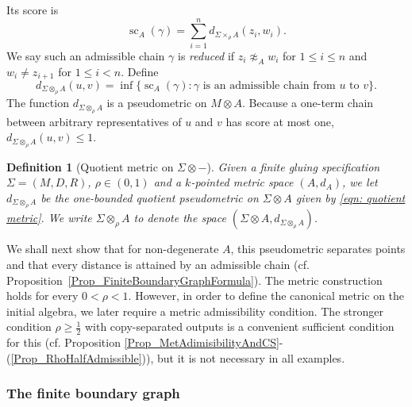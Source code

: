 \documentclass{sn-jnl}%
\theoremstyle{thmstyleone}%
\theoremstyle{thmstyletwo}%
\theoremstyle{thmstylethree}%
\newtheorem{definition}{Definition}%
\newcommand{\M}{\Sigma}
\newcommand{\F}{\M\otimes}
\newcommand{\Fw}{\M\otimes_{\w}}
\newcommand{\dm}[1]{d_{\M \times_{\w} #1}}
\newcommand{\dqm}[1]{d_{\M \otimes_{\w} #1}}
\newcommand{\w}{\rho}
\begin{document}
Its score is
\begin{equation*}
    \operatorname{sc}_A(\gamma) = \sum_{i=1}^n \dm{A}(z_i,w_i).
\label{Eqn_score}
\end{equation*}
We say such an admissible chain $\gamma$ is \emph{reduced} if $z_i\not\approx_A w_i$ for $1\leq i\leq n$ and $w_i\neq z_{i+1}$ for $1\leq i<n$. Define
\begin{equation}
    \dqm A\left(u,v\right) =\inf\{\operatorname{sc}_A(\gamma): \gamma\text{ is an admissible chain from }u\text{ to }v\}.
\label{eqn: quotient metric}
\end{equation}
The function $\dqm A$ is a pseudometric on $M\otimes A$. Because a one-term chain between arbitrary representatives of $u$ and $v$ has score at most one, $\dqm A(u,v)\leq1$.

\begin{definition}[Quotient metric on $\F -$]
\label{Def_MeticOnM_otimes_A}
    Given a finite gluing specification $\Sigma=(M,D,R)$, $\w \in (0,1)$ and a $k$-pointed metric space $(A, d_A)$, we let $\dqm{A}$ be the one-bounded quotient pseudometric on $\F A$ given by \eqref{eqn: quotient metric}. We write $\Fw A$ to denote the space $\left(\F A, \dqm{A}\right)$.
\end{definition}

We shall next show that for non-degenerate $A$, this pseudometric separates points and that every distance is attained by an admissible chain (cf. Proposition~\ref{Prop_FiniteBoundaryGraphFormula}). The metric construction holds for every $0<\w<1$.  However, in order to define the canonical metric on the initial algebra, we later require a metric admissibility condition.  The stronger condition $\w\geq \frac{1}{2}$ with copy-separated outputs is a convenient sufficient condition for this (cf. Proposition \ref{Prop_MetAdimisibilityAndCS}-(\ref{Prop_RhoHalfAdmissible})), but it is not necessary in all examples.

\subsubsection{The finite boundary graph}
\label{subsec:finite boundary graph}
\end{document}
